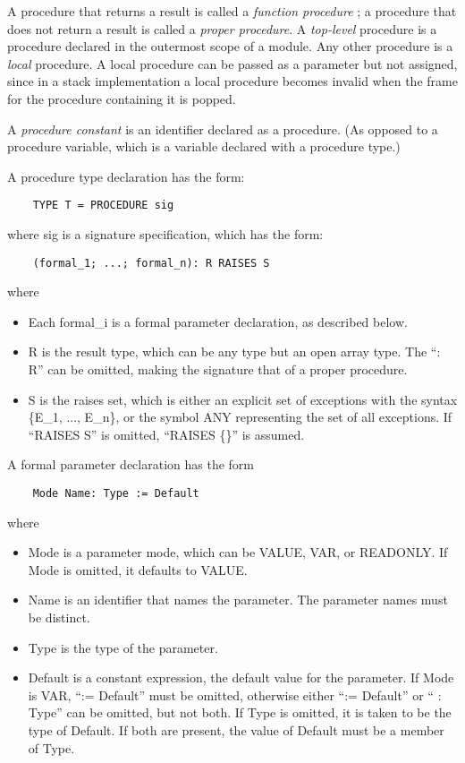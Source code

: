 \documentclass[10pt]{article}
\begin{document}
A procedure that returns a result is called a \emph{function procedure} ; a
procedure that does not return a result is called a \emph{proper procedure}.
A \emph{top-level} procedure is a procedure declared in the outermost scope of
a module.  Any other procedure is a \emph{local} procedure.  A local procedure
can be passed as a parameter but not assigned, since in a stack implementation
a local procedure becomes invalid when the frame for the procedure containing
it is popped.

A \emph{procedure constant} is an identifier declared as a procedure.  (As
opposed to a procedure variable, which is a variable declared with a procedure
type.)

A procedure type declaration has the form:
\begin{verbatim}
    TYPE T = PROCEDURE sig
\end{verbatim}
where sig is a signature specification, which has the form:
\begin{verbatim}
    (formal_1; ...; formal_n): R RAISES S
\end{verbatim}
where
\begin{itemize}
\item Each formal\_i is a formal parameter declaration, as described below.
\item R is the result type, which can be any type but an open array type.  The ``: R'' can be omitted, making the signature that of a proper procedure.
\item S is the raises set, which is either an explicit set of exceptions with
  the syntax \{E\_1, ..., E\_n\}, or the symbol ANY representing the set of
  all exceptions.  If ``RAISES S'' is omitted, ``RAISES \{\}'' is assumed.
\end{itemize}

A formal parameter declaration has the form
\begin{verbatim}
    Mode Name: Type := Default
\end{verbatim}
where
\begin{itemize}
\item Mode is a parameter mode, which can be VALUE, VAR, or READONLY.  If Mode
  is omitted, it defaults to VALUE.
\item Name is an identifier that names the parameter.  The parameter names
  must be distinct.
\item Type is the type of the parameter.
\item Default is a constant expression, the default value for the parameter.
  If Mode is VAR, ``:= Default'' must be omitted, otherwise either ``:=
  Default'' or `` : Type'' can be omitted, but not both.  If Type is omitted,
  it is taken to be the type of Default.  If both are present, the value of
  Default must be a member of Type.
\end{itemize}
\end{document}
